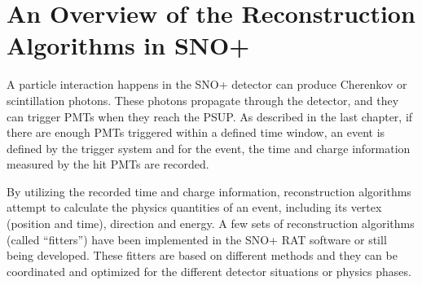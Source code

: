 
\section{An Overview of the Reconstruction Algorithms in SNO+}
A particle interaction happens in the SNO+ detector can produce Cherenkov or scintillation photons. These photons propagate through the detector, and they can trigger PMTs when they reach the PSUP. As described in the last chapter, if there are enough PMTs triggered within a defined time window, an event is defined by the trigger system and for the event, the time and charge information measured by the hit PMTs are recorded.

By utilizing the recorded time and charge information, reconstruction algorithms attempt to calculate the physics quantities of an event, including its vertex (position and time), direction and energy. A few sets of reconstruction algorithms (called ``fitters'') have been implemented in the SNO+ RAT software or still being developed. These fitters are based on different methods and they can be coordinated and optimized for the different detector situations or physics phases.


